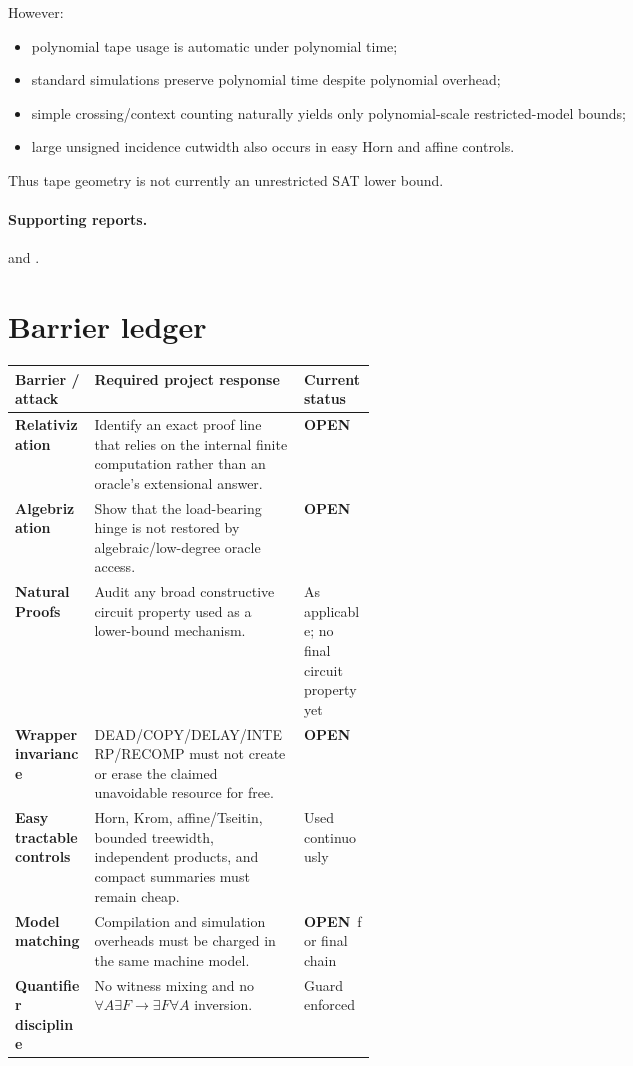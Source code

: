 \documentclass[11pt]{article}
\newcommand{\statusopen}{\textcolor{openstatus}{\textbf{OPEN}}}
\begin{document}
However:
\begin{itemize}
  \item polynomial tape usage is automatic under polynomial time;
  \item standard simulations preserve polynomial time despite polynomial overhead;
  \item simple crossing/context counting naturally yields only polynomial-scale restricted-model
        bounds;
  \item large unsigned incidence cutwidth also occurs in easy Horn and affine controls.
\end{itemize}
Thus tape geometry is not currently an unrestricted SAT lower bound.

\paragraph{Supporting reports.}
and
.

\section{Barrier ledger}

\begin{tabularx}{\linewidth}{>{\bfseries}p{0.22\linewidth} X >{\raggedright\arraybackslash}p{0.20\linewidth}}
\toprule
Barrier / attack & Required project response & Current status\\
\midrule
Relativization &
Identify an exact proof line that relies on the internal finite computation rather than an oracle's
extensional answer. &
\statusopen\\

Algebrization &
Show that the load-bearing hinge is not restored by algebraic/low-degree oracle access. &
\statusopen\\

Natural Proofs &
Audit any broad constructive circuit property used as a lower-bound mechanism. &
As applicable; no final circuit property yet\\

Wrapper invariance &
DEAD/COPY/DELAY/INTERP/RECOMP must not create or erase the claimed unavoidable resource for free. &
\statusopen\\

Easy tractable controls &
Horn, Krom, affine/Tseitin, bounded treewidth, independent products, and compact summaries must remain
cheap. &
Used continuously\\

Model matching &
Compilation and simulation overheads must be charged in the same machine model. &
\statusopen\ for final chain\\

Quantifier discipline &
No witness mixing and no \(\forall A\exists F\to\exists F\forall A\) inversion. &
Guard enforced\\
\bottomrule
\end{tabularx}
\end{document}
